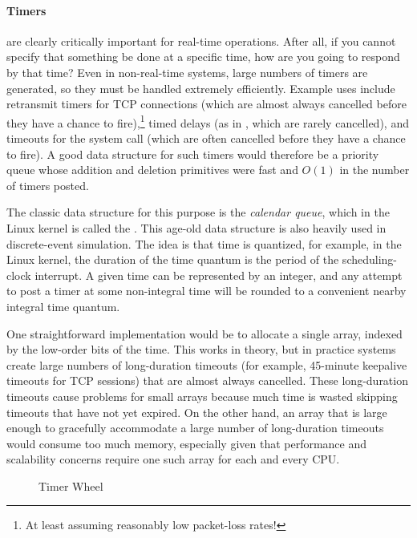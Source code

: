 \paragraph{Timers} are clearly critically important for real-time
operations.
After all, if you cannot specify that something be done at a specific
time, how are you going to respond by that time?
Even in non-real-time systems, large numbers of timers are generated,
so they must be handled extremely efficiently.
Example uses include retransmit timers for TCP connections (which are
almost always cancelled before they have a chance to fire),\footnote{
	At least assuming reasonably low packet-loss rates!}
timed delays (as in , which are rarely cancelled),
and timeouts for the  system call (which are often
cancelled before they have a chance to fire).
A good data structure for such timers would therefore be a priority queue
whose addition and deletion primitives were fast and $O(1)$ in the number
of timers posted.

The classic data structure for this purpose is the \emph{calendar queue},
which in the Linux kernel is called the .
This age-old data structure is also heavily used in discrete-event
simulation.
The idea is that time is quantized, for example, in the Linux kernel,
the duration of the time quantum is the period of the scheduling-clock
interrupt.
A given time can be represented by an integer, and any attempt to post
a timer at some non-integral time will be rounded to a convenient nearby
integral time quantum.

One straightforward implementation would be to allocate a single array,
indexed by the low-order bits of the time.
This works in theory, but in practice systems create large numbers of
long-duration timeouts (for example, 45-minute keepalive timeouts for TCP
sessions) that are almost always cancelled.
These long-duration timeouts cause problems for small arrays because
much time is wasted skipping timeouts that have not yet expired.
On the other hand, an array that is large enough to gracefully accommodate
a large number of long-duration timeouts would consume too much memory,
especially given that performance and scalability concerns require one
such array for each and every CPU.

\begin{figure}[tb]
\centering
{}
\caption{Timer Wheel}
\label{fig:rt:Timer Wheel}
\end{figure}

